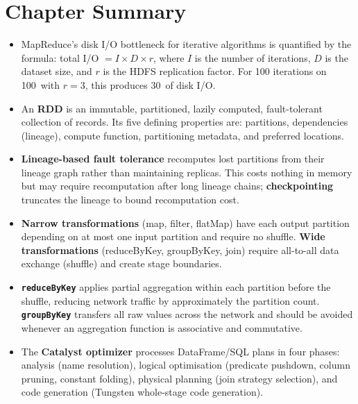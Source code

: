 \section*{Chapter Summary}
\label{sec:ch6-summary}

\begin{itemize}
  \item MapReduce's disk I/O bottleneck for iterative algorithms is
        quantified by the formula: total I/O $= I \times D \times r$,
        where $I$ is the number of iterations, $D$ is the dataset size,
        and $r$ is the HDFS replication factor. For 100 iterations
        on 100\GB\ with $r=3$, this produces 30\TB\ of disk I/O.

  \item An \textbf{RDD} is an immutable, partitioned, lazily computed,
        fault-tolerant collection of records. Its five defining properties
        are: partitions, dependencies (lineage), compute function,
        partitioning metadata, and preferred locations.

  \item \textbf{Lineage-based fault tolerance} recomputes lost partitions
        from their lineage graph rather than maintaining replicas. This
        costs nothing in memory but may require recomputation after
        long lineage chains; \textbf{checkpointing} truncates the lineage
        to bound recomputation cost.

  \item \textbf{Narrow transformations} (map, filter, flatMap) have each
        output partition depending on at most one input partition and
        require no shuffle. \textbf{Wide transformations} (reduceByKey,
        groupByKey, join) require all-to-all data exchange (shuffle)
        and create stage boundaries.

  \item \textbf{\texttt{reduceByKey}} applies partial aggregation within
        each partition before the shuffle, reducing network traffic by
        approximately the partition count. \textbf{\texttt{groupByKey}}
        transfers all raw values across the network and should be avoided
        whenever an aggregation function is associative and commutative.

  \item The \textbf{Catalyst optimizer} processes DataFrame/SQL plans in
        four phases: analysis (name resolution), logical optimisation
        (predicate pushdown, column pruning, constant folding), physical
        planning (join strategy selection), and code generation (Tungsten
        whole-stage code generation).


\end{itemize}
